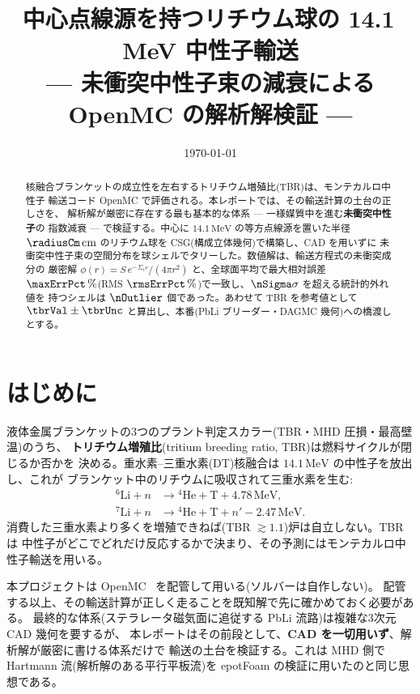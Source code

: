 \documentclass{ltjsarticle}   %
\title{中心点線源を持つリチウム球の 14.1\,MeV 中性子輸送\\
  --- 未衝突中性子束の減衰による OpenMC の解析解検証 ---}
\author{}
\date{\today}
\newcommand{\Sigmat}{\Sigma_\mathrm{t}}
\begin{document}
\maketitle

\begin{abstract}
核融合ブランケットの成立性を左右するトリチウム増殖比(TBR)は、モンテカルロ中性子
輸送コード OpenMC で評価される。本レポートでは、その輸送計算の土台の正しさを、
解析解が厳密に存在する最も基本的な体系 --- 一様媒質中を進む\textbf{未衝突中性子}の
指数減衰 --- で検証する。中心に $14.1\,\mathrm{MeV}$ の等方点線源を置いた半径
$\radiusCm\,\mathrm{cm}$ のリチウム球を CSG(構成立体幾何)で構築し、CAD を用いずに
未衝突中性子束の空間分布を球シェルでタリーした。数値解は、輸送方程式の未衝突成分の
厳密解 $\phi(r)=S\,e^{-\Sigmat r}/(4\pi r^2)$ と、全球面平均で最大相対誤差
$\maxErrPct\,\%$(RMS $\rmsErrPct\,\%$)で一致し、$\nSigma\sigma$ を超える統計的外れ値を
持つシェルは $\nOutlier$ 個であった。あわせて TBR を参考値として
$\tbrVal\pm\tbrUnc$ と算出し、本番(PbLi ブリーダー・DAGMC 幾何)への橋渡しとする。
\end{abstract}

\section{はじめに}

液体金属ブランケットの3つのプラント判定スカラー(TBR・MHD 圧損・最高壁温)のうち、
\textbf{トリチウム増殖比}(tritium breeding ratio, TBR)は燃料サイクルが閉じるか否かを
決める。重水素--三重水素(DT)核融合は $14.1\,\mathrm{MeV}$ の中性子を放出し、これが
ブランケット中のリチウムに吸収されて三重水素を生む:
\begin{align}
  {}^{6}\mathrm{Li} + n &\to {}^{4}\mathrm{He} + \mathrm{T} + 4.78\,\mathrm{MeV}, \\
  {}^{7}\mathrm{Li} + n &\to {}^{4}\mathrm{He} + \mathrm{T} + n' - 2.47\,\mathrm{MeV}.
\end{align}
消費した三重水素より多くを増殖できねば(TBR $\gtrsim 1.1$)炉は自立しない。TBR は
中性子がどこでどれだけ反応するかで決まり、その予測にはモンテカルロ中性子輸送を用いる。

本プロジェクトは OpenMC~\cite{romano2015} を配管して用いる(ソルバーは自作しない)。
配管する以上、その輸送計算が正しく走ることを既知解で先に確かめておく必要がある。
最終的な体系(ステラレータ磁気面に追従する PbLi 流路)は複雑な3次元 CAD 幾何を要するが、
本レポートはその前段として、\textbf{CAD を一切用いず}、解析解が厳密に書ける体系だけで
輸送の土台を検証する。これは MHD 側で Hartmann 流(解析解のある平行平板流)を
epotFoam の検証に用いたのと同じ思想である。
\end{document}
